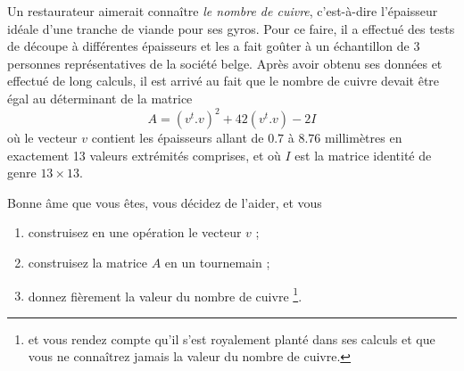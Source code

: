\begin{exercice}\label{exoMatlab0028}

Un restaurateur aimerait connaître \emph{le nombre de cuivre}, c'est-à-dire l'épaisseur idéale d'une tranche de viande pour ses gyros. Pour ce faire, il a effectué des tests de découpe à différentes épaisseurs et les a fait goûter à un échantillon de 3 personnes représentatives de la société belge.
Après avoir obtenu ses données et effectué de long calculs, il est arrivé au fait que le nombre de cuivre devait être égal au déterminant de la matrice
\[ A= (v^t.v)^2 + 42(v^t.v) - 2I \]
où le vecteur $v$ contient les épaisseurs allant de $0.7$ à $8.76$ millimètres en exactement 13 valeurs extrémités comprises, et où
$I$ est la matrice identité de genre $13\times 13$.

Bonne âme que vous êtes, vous décidez de l'aider, et vous
\begin{enumerate}
\item construisez en une opération le vecteur $v$ ;
\item construisez la matrice $A$ en un tournemain ;
\item donnez fièrement la valeur du nombre de cuivre \footnote{et vous rendez compte qu'il s'est royalement planté dans ses calculs et que vous ne connaîtrez jamais la valeur du nombre de cuivre.}.
\end{enumerate}

\end{exercice}
